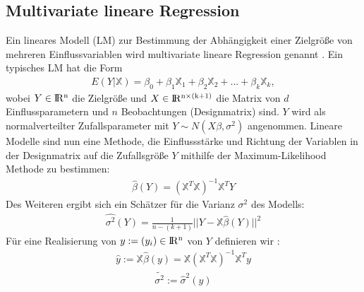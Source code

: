 	\subsection{Multivariate lineare Regression}
	Ein lineares Modell (LM) zur Bestimmung der Abhängigkeit einer Zielgröße von mehreren Einflussvariablen wird multivariate lineare Regression genannt \cite{weisberg2005}. Ein typisches LM hat die Form
	\begin{align}
	E(Y|\mathbb{X}) = \beta_0 + \beta_1\mathbb{X}_1 + \beta_2\mathbb{X}_2 + ... + \beta_k\mathbb{X}_k,
	\end{align}
	wobei $Y\in \rm I\!R^{n}$ die Zielgröße und $X \in \rm I\!R^{n \times (k+1)}$ die Matrix von $d$ Einflussparametern und $n$ Beobachtungen (Designmatrix) sind. $Y$ wird als normalverteilter Zufallsparameter mit $ Y \sim N(X\beta, \sigma^2)$ angenommen. Lineare Modelle sind nun eine Methode, die Einflussstärke und Richtung der Variablen in der Designmatrix auf die Zufallsgröße $Y$ mithilfe der Maximum-Likelihood Methode zu bestimmen:
	\begin{align}
	\hat{\beta}(Y) = (\mathbb{X}^T\mathbb{X})^{-1}\mathbb{X}^TY
	\end{align}
	Des Weiteren ergibt sich ein Schätzer für die Varianz $\sigma^2$ des Modells:
	\begin{align}
	\hat{\sigma^2}(Y) = \frac{1}{n-(k+1)}||Y-\mathbb{X}\hat{\beta}(Y)||^2
	\end{align}
	Für eine Realisierung von $y := (y_i) \in \rm I\!R^{n}$ von $Y$ definieren wir \cite{Schumacher.2019}:
	\begin{align}
	\hat{y} := \mathbb{X}\hat{\beta}(y) =\mathbb{X} (\mathbb{X}^T\mathbb{X})^{-1}\mathbb{X}^Ty
	\end{align}	
	\begin{align}
	\tilde{\sigma^2}:= \hat{\sigma}^2(y)
	\end{align}

